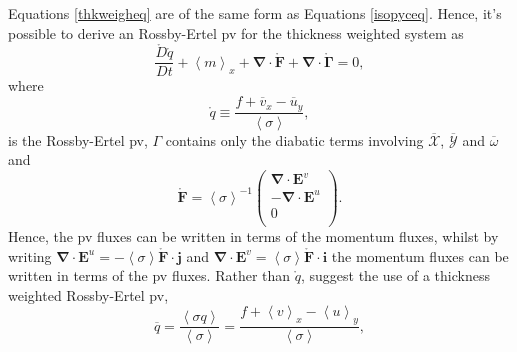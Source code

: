 \documentclass[10pt,a4paper]{article}
\newcommand*\thkmean[1]{\overline{#1}}
\newcommand*\nthkmean[1]{\left\langle{#1}\right\rangle}
\newcommand*\spec[1]{\mathring{#1}}
\begin{document}
                      Equations \ref{thkweigheq} are of the same form as Equations 
                      \ref{isopyceq}. Hence, it's possible to derive an
                      Rossby-Ertel \gls{pv} for the thickness weighted system
                      as
                      \begin{equation}
                      \frac{\spec{D} \spec{q}}{D t} + \nthkmean{m}_{x} 
                      +\boldsymbol{\nabla}\cdot\spec{\boldsymbol{F}}
                      +\boldsymbol{\nabla}\cdot\spec{\boldsymbol{\Gamma}}=0,
                      \end{equation} 
                      where
                      \begin{equation}
                      \spec{q}\equiv\frac{f+\thkmean{v}_{x}-\thkmean{u}_{y}}{\nthkmean{\sigma}},
                      \end{equation}
                      is the Rossby-Ertel \gls{pv}, $\Gamma$ contains only the diabatic terms involving $\thkmean{\mathcal{X}} $, $\thkmean{\mathcal{Y}} $ and $\thkmean{\omega} $ and 
                      \begin{equation}
                      \spec{\boldsymbol{F}}=\nthkmean{\sigma}^{-1}\left(
                      \begin{array}{c}
                      \boldsymbol{\nabla}\cdot\boldsymbol{E}^v \\
                      -\boldsymbol{\nabla}\cdot\boldsymbol{E}^u\\
                      0 \\
                      \end{array}\right).
                      \end{equation}
                      Hence, the \gls{pv} fluxes can be written in terms of
                      the momentum fluxes, whilst by writing ${\boldsymbol{\nabla}\cdot\boldsymbol{E}^u = -\nthkmean{\sigma} \spec{\boldsymbol{F}}\cdot\boldsymbol{j}}$ and
                      ${\boldsymbol{\nabla}\cdot\boldsymbol{E}^v = \nthkmean{\sigma} \spec{\boldsymbol{F}}\cdot\boldsymbol{i}}$ the momentum fluxes
                      can be written in terms of the \gls{pv} fluxes.
                      Rather than $\spec{q}$, \cite{greatbatch1998exploring} suggest
                      the use of a thickness weighted Rossby-Ertel \gls{pv},
                      \begin{equation}
                      \thkmean{q}=\frac{\nthkmean{\sigma q}}{\nthkmean{\sigma}}=\frac{f+\nthkmean{v}_{x}-\nthkmean{u}_{y}}{\nthkmean{\sigma}},
                      \end{equation}
\end{document}

